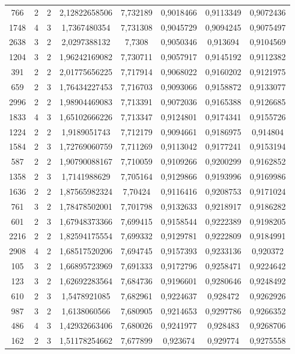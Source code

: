 \begin{longtable}{|c|c|c|c|c|c|c|c|}
766 & 2 & 2 & 2,12822658506 & 7,732189 & 0,9018466 & 0,9113349 & 0,9072436 \\
1748 & 4 & 3 & 1,7367480354 & 7,731308 & 0,9045729 & 0,9094245 & 0,9075497 \\
2638 & 3 & 2 & 2,0297388132 & 7,7308 & 0,9050346 & 0,913694 & 0,9104569 \\
1204 & 3 & 2 & 1,96242169082 & 7,730711 & 0,9057917 & 0,9145192 & 0,9112382 \\
391 & 2 & 2 & 2,01775656225 & 7,717914 & 0,9068022 & 0,9160202 & 0,9121975 \\
659 & 2 & 3 & 1,76434227453 & 7,716703 & 0,9093066 & 0,9158872 & 0,9133077 \\
2996 & 2 & 2 & 1,98904469083 & 7,713391 & 0,9072036 & 0,9165388 & 0,9126685 \\
1833 & 4 & 3 & 1,65102666226 & 7,713347 & 0,9124801 & 0,9174341 & 0,9155726 \\
1224 & 2 & 2 & 1,9189051743 & 7,712179 & 0,9094661 & 0,9186975 & 0,914804 \\
1584 & 2 & 3 & 1,72769060759 & 7,711269 & 0,9113042 & 0,9177241 & 0,9153194 \\
587 & 2 & 2 & 1,90790088167 & 7,710059 & 0,9109266 & 0,9200299 & 0,9162852 \\
1358 & 2 & 3 & 1,7141988629 & 7,705164 & 0,9129866 & 0,9193996 & 0,9169986 \\
1636 & 2 & 2 & 1,87565982324 & 7,70424 & 0,9116416 & 0,9208753 & 0,9171024 \\
761 & 3 & 2 & 1,78478502001 & 7,701798 & 0,9132633 & 0,9218917 & 0,9186282 \\
601 & 2 & 3 & 1,67948373366 & 7,699415 & 0,9158544 & 0,9222389 & 0,9198205 \\
2216 & 2 & 2 & 1,82594175554 & 7,699332 & 0,9129781 & 0,9222809 & 0,9184991 \\
2908 & 4 & 2 & 1,68517520206 & 7,694745 & 0,9157393 & 0,9233136 & 0,920372 \\
105 & 3 & 2 & 1,66895723969 & 7,691333 & 0,9172796 & 0,9258471 & 0,9224642 \\
123 & 3 & 2 & 1,62692283564 & 7,684736 & 0,9196601 & 0,9280646 & 0,9248492 \\
610 & 2 & 3 & 1,5478921085 & 7,682961 & 0,9224637 & 0,928472 & 0,9262926 \\
987 & 3 & 2 & 1,6138060566 & 7,680905 & 0,9214653 & 0,9297786 & 0,9266352 \\
486 & 4 & 3 & 1,42932663406 & 7,680026 & 0,9241977 & 0,928483 & 0,9268706 \\
162 & 2 & 3 & 1,51178254662 & 7,677899 & 0,923674 & 0,929774 & 0,9275558 \\

\end{longtable}
